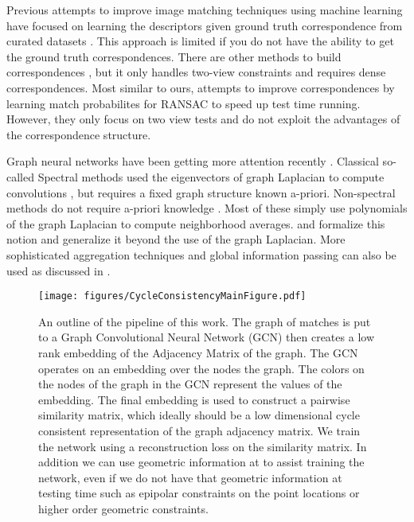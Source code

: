\documentclass[10pt,twocolumn,letterpaper]{article}
\begin{document}
Previous attempts to improve image matching techniques using machine learning have focused on learning the descriptors given ground truth correspondence from curated datasets \cite{zagoruyko2015learning, yi2016lift, brachmann2017dsac}.
This approach is limited if you do not have the ability to get the ground truth correspondences.
There are other methods to build correspondences \cite{choy2016universal}, but it only handles two-view constraints and requires dense correspondences.
Most similar to ours, \cite{yi2018learning} attempts to improve correspondences by learning match probabilites for RANSAC to speed up test time running.
However, they only focus on two view tests and do not exploit the advantages of the correspondence structure.

Graph neural networks have been getting more attention recently \cite{bronstein2017geometric, bruna2013spectral, defferrard2016convolutional, kipf2016semi, scarselli2009graph, gama2018mimo, gama2018convolutional, battaglia2018relational}.
Classical so-called Spectral methods used the eigenvectors of graph Laplacian to compute convolutions \cite{bronstein2017geometric}, but requires a fixed graph structure known a-priori.  
Non-spectral methods do not require a-priori knowledge \cite{bronstein2017geometric, kipf2016semi, scarselli2009graph, gama2018convolutional}.
Most of these simply use polynomials of the graph Laplacian to compute neighborhood averages. \cite{gama2018mimo} and \cite{gama2018convolutional} formalize this notion and generalize it beyond the use of the graph Laplacian.
More sophisticated aggregation techniques and global information passing can also be used as discussed in \cite{battaglia2018relational}.

\begin{figure*}[t]
\begin{center}
  \texttt{[image: figures/CycleConsistencyMainFigure.pdf]}
\end{center}
  \caption{
    An outline of the pipeline of this work.
    The graph of matches is put to a Graph Convolutional Neural Network (GCN) \cite{kipf2016semi} then creates a low rank embedding of the Adjacency Matrix of the graph.
    The GCN operates on an embedding over the nodes the graph.
    The colors on the nodes of the graph in the GCN represent the values of the embedding.
    The final embedding is used to construct a pairwise similarity matrix, which ideally should be a low dimensional cycle consistent representation of the graph adjacency matrix.
    We train the network using a reconstruction loss on the similarity matrix.
    In addition we can use geometric information at to assist training the network, even if we do not have that geometric information at testing time such as epipolar constraints on the point locations or higher order geometric constraints.
  }
\label{fig:pipeline}
\label{fig:onecol}
\end{figure*}
\end{document}
